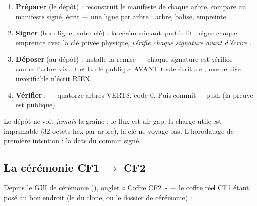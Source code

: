 \begin{enumerate}
\item \textbf{Préparer} (le dépôt) :  reconstruit le
manifeste de chaque arbre, compare au manifeste signé, écrit  —
une ligne par arbre : arbre, balise, empreinte.
\item \textbf{Signer} (hors ligne, votre clé) : la cérémonie autoportée
 lit , signe chaque
empreinte avec la clé privée physique, \emph{vérifie chaque signature avant
d'écrire} .
\item \textbf{Déposer} (au dépôt) :  installe la remise —
chaque signature est vérifiée contre l'arbre vivant et la clé publique AVANT toute
écriture ; une remise invérifiable n'écrit RIEN.
\item \textbf{Vérifier} :  — quatorze arbres VERTS, code 0.
Puis commit + push (la preuve est publique).
\end{enumerate}

Le dépôt ne voit \emph{jamais} la graine : le flux est air-gap, la charge utile est
imprimable (32 octets hex par arbre), la clé ne voyage pas. L'horodatage de première
intention : la date du commit signé.

\subsection{La cérémonie CF1 $\to$ CF2}\label{sec:cercf2}

Depuis le GUI de cérémonie (), onglet « Coffre CF2 » — le
coffre réel CF1 étant posé au bon endroit (le  du clone, ou
le dossier de cérémonie) :

